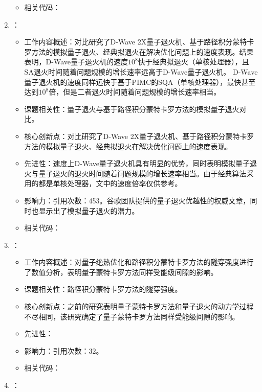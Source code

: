 \begin{enumerate}
\begin{itemize}
                \item 相关代码：
            \end{itemize}
            \item \citet{denchev2016computational}：
            \begin{itemize}
                \item 工作内容概述：对比研究了D-Wave 2X量子退火机、基于路径积分蒙特卡罗方法的模拟量子退火、经典拟退火在解决优化问题上的速度表现。结果表明，D-Wave量子退火机的速度$10^8$快于经典拟退火（单核处理器），且SA退火时间随着问题规模的增长速率远高于D-Wave量子退火机。
                D-Wave量子退火机的速度同样远快于基于PIMC的SQA（单核处理器），最快甚至达到$10^8$倍，但是二者退火时间随着问题规模的增长速率相当。
                \item 课题相关性：量子退火与基于路径积分蒙特卡罗方法的模拟量子退火对比。
                \item 核心创新点：对比研究了D-Wave 2X量子退火机、基于路径积分蒙特卡罗方法的模拟量子退火、经典拟退火在解决优化问题上的速度表现。
                \item 先进性：速度上D-Wave量子退火机具有明显的优势，同时表明模拟量子退火与量子退火的退火时间随着问题规模的增长速率相当。由于经典算法采用的都是单核处理器，文中的速度倍率仅供参考。
                \item 影响力：引用次数：453。谷歌团队提供的量子退火优越性的权威文章，同时也显示出了模拟量子退火的潜力。
                \item 相关代码：
            \end{itemize}
            \item \citet{brady2016quantum}：
            \begin{itemize}
                \item 工作内容概述：对量子绝热优化和路径积分蒙特卡罗方法的隧穿强度进行了数值分析，表明量子蒙特卡罗方法同样受能级间隙的影响。
                \item 课题相关性：路径积分蒙特卡罗方法的隧穿强度。
                \item 核心创新点：之前\citet{liu2015quantum}的研究表明量子蒙特卡罗方法和量子退火的动力学过程不尽相同，该研究确定了量子蒙特卡罗方法同样受能级间隙的影响。
                \item 先进性：
                \item 影响力：引用次数：32。
                \item 相关代码：
            \end{itemize}
            \item \citet{andriyash2017can}：

\end{enumerate}
